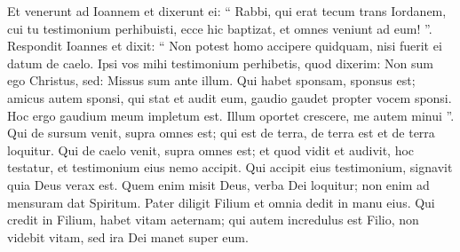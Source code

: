 \begin{biblechapter}
\begin{biblechapter}
\begin{biblechapter}
 \verse Et venerunt ad Ioannem et dixerunt ei: “ Rabbi, qui erat tecum trans Iordanem, cui tu testimonium perhibuisti, ecce hic baptizat, et omnes veniunt ad eum! ”. 
\verse Respondit Ioannes et dixit: “ Non potest homo accipere quidquam, nisi fuerit ei datum de caelo. 
\verse Ipsi vos mihi testimonium perhibetis, quod dixerim: Non sum ego Christus, sed: Missus sum ante illum. 
\verse Qui habet sponsam, sponsus est; amicus autem sponsi, qui stat et audit eum, gaudio gaudet propter vocem sponsi. Hoc ergo gaudium meum impletum est. 
\verse Illum oportet crescere, me autem minui ”.
 \verse Qui de sursum venit, supra omnes est; qui est de terra, de terra est et de terra loquitur. Qui de caelo venit, supra omnes est; 
\verse et quod vidit et audivit, hoc testatur, et testimonium eius nemo accipit. 
\verse Qui accipit eius testimonium, signavit quia Deus verax est.
 \verse Quem enim misit Deus, verba Dei loquitur; non enim ad mensuram dat Spiritum. 
\verse Pater diligit Filium et omnia dedit in manu eius. 
\verse Qui credit in Filium, habet vitam aeternam; qui autem incredulus est Filio, non videbit vitam, sed ira Dei manet super eum.
 

\end{biblechapter}
\end{biblechapter}
\end{biblechapter}
